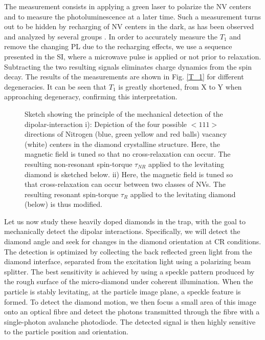 \documentclass[preprintnumbers,amsmath,amssymb,superscriptaddress,twocolumn,showpacs]{revtex4-1}
\begin{document}
The measurement consists in applying a green laser to polarize the NV centers and to measure the photoluminescence at a later time. 
Such a measurement turns out to be hidden by recharging of NV centers in the dark, as has been observed and analyzed by several groups \cite{choi_depolarization_2017, mrozek_longitudinal_2015, giri_selective_2019, giri_coupled_2018}.
In order to accurately measure the $T_1$ and remove the changing PL due to the recharging effects, we use a sequence presented in the SI, where a microwave pulse is applied or not prior to relaxation. Subtracting the two resulting signals eliminates charge dynamics from the spin decay.
The results of the measurements are shown in Fig. \ref{T_1} for different degeneracies. 
It can be seen that $T_1$ is greatly shortened, from X to Y when approaching degeneracy, confirming this interpretation.

\begin{figure}[!ht]
  \centering {}
  \caption{Sketch showing the principle of the mechanical detection of the dipolar-interaction i): Depiction of the four possible $<111>$ directions of Nitrogen (blue, green yellow and red balls) vacancy (white) centers in the diamond crystalline structure. Here, the magnetic field is tuned so that no cross-relaxation can occur.
The resulting non-resonant spin-torque $\tau_{NR}$ applied to the levitating diamond is sketched below. 
ii) Here, the magnetic field is tuned so that cross-relaxation can occur between two classes of NVs.
The resulting resonant spin-torque $\tau_{R}$ applied to the levitating diamond (below) is thus modified. 
  }\label{principle}
\end{figure}

%

Let us now study these heavily doped diamonds in the trap, with the goal to mechanically detect the dipolar interactions.
Specifically, we will detect the diamond angle and seek for changes in the diamond orientation at CR conditions. The detection is optimized by collecting the back reflected green light from the diamond interface, separated from the excitation light using a polarizing beam splitter. The best sensitivity is achieved by using a speckle pattern produced by the rough surface of the micro-diamond under coherent illumination. When the particle is stably levitating, at the particle image plane, a speckle feature is formed. To detect the diamond motion, we then focus a small area of this image onto an optical fibre and detect the photons transmitted through the fibre with a single-photon avalanche photodiode. The detected signal is then highly sensitive to the particle position and orientation.
\end{document}
